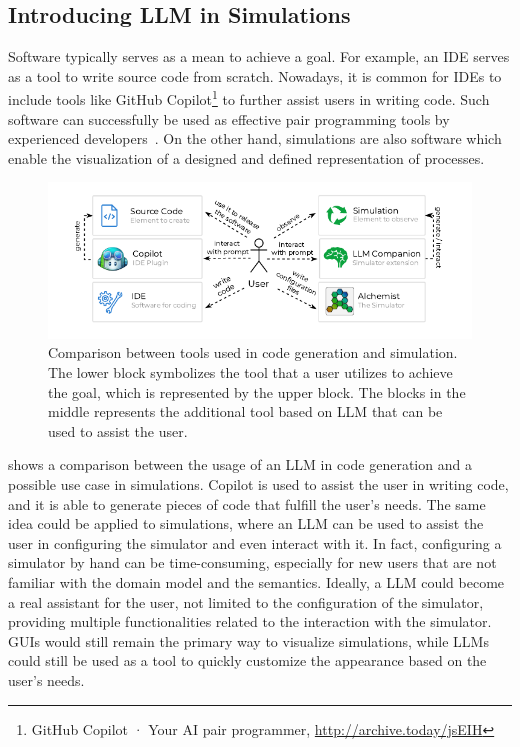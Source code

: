 \documentclass[conference]{IEEEtran}
\begin{document}
\subsection{Introducing \ac{LLM} in Simulations}
Software typically serves as a mean to achieve a goal.
%
For example,
an \ac{IDE} serves as a tool to write source code from scratch.
%
Nowadays,
it is common for \acp{IDE} to include tools like GitHub Copilot\footnote{
    GitHub Copilot · Your AI pair programmer, \url{http://archive.today/jsEIH}
} to further assist users in writing code.
%
Such software can successfully be used as effective pair programming tools by experienced developers~\cite{DBLP:journals/jss/DakhelMNKDJ23}.
%
On the other hand,
simulations are also software which enable the visualization of a designed and defined representation of processes.
%
\begin{figure}
    \includegraphics[width=0.954\columnwidth]{use-case}
    \caption{
        Comparison between tools used in code generation and simulation.
        The lower block symbolizes the tool that a user utilizes to achieve the goal,
        which is represented by the upper block.
        The blocks in the middle represents the additional tool based on \ac{LLM} that can be used to assist the user.
    }
    \label{fig:usecase}
\end{figure}
%
 shows a comparison between the usage of an \ac{LLM} in code generation and a possible use case in simulations.
%
Copilot is used to assist the user in writing code,
and it is able to generate pieces of code that fulfill the user's needs.
%
The same idea could be applied to simulations,
where an \ac{LLM} can be used to assist the user in configuring the simulator and even interact with it.
%
In fact,
configuring a simulator by hand can be time-consuming,
especially for new users that are not familiar with the domain model and the semantics.
%
Ideally,
a \ac{LLM} could become a real assistant for the user,
not limited to the configuration of the simulator,
providing multiple functionalities related to the interaction with the simulator.
%
\acp{GUI} would still remain the primary way to visualize simulations,
while \acp{LLM} could still be used as a tool to quickly customize the appearance based on the user's needs.
\end{document}
